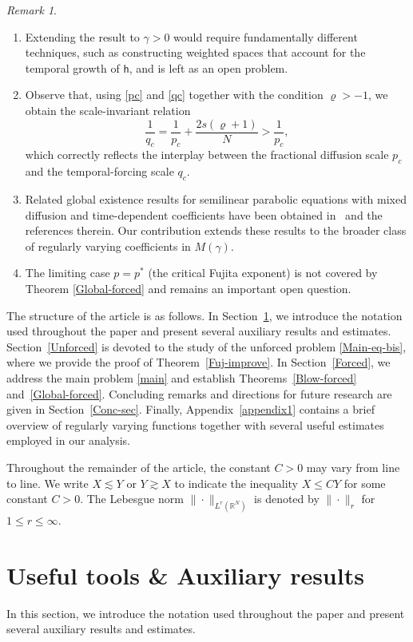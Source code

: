 \documentclass[12pt,reqno]{amsart}
\theoremstyle{plain}
\theoremstyle{definition}
\theoremstyle{remark}
\newtheorem{rem}[thm]{Remark}
\numberwithin{equation}{section}
\newcommand{\h}{\mathsf h}
\begin{document}
\begin{rem}
\begin{enumerate}[label=(\roman*)]
\item Extending the result to $\gamma > 0$ would require fundamentally different 
    techniques, such as constructing weighted spaces that account for the temporal growth of $\h$, 
    and is left as an open problem.
        \item Observe that, using \eqref{pc} and \eqref{qc} together with the 
    condition $\varrho > -1$, we obtain the scale-invariant relation
    $$\frac{1}{q_c} = \frac{1}{p_c} + \frac{2s(\varrho+1)}{N} > \frac{1}{p_c},$$
    which correctly reflects the interplay between the fractional diffusion scale $p_c$ and 
    the temporal-forcing scale $q_c$.
    \item Related global existence results for semilinear parabolic equations with 
    mixed diffusion and time-dependent coefficients have been obtained in~\cite{Beri-arXiv, JKS, MM, Majd} 
    and the references therein. Our contribution extends these results to the broader class 
    of regularly varying coefficients in $M(\gamma)$.
    \item The limiting case $p = p^*$ (the critical Fujita exponent) is not covered 
    by Theorem \ref{Global-forced} and remains an important open question. 
    \end{enumerate}
\end{rem}
The structure of the article is as follows. In Section~\ref{S2}, we introduce the notation used throughout the paper and present several auxiliary results and estimates. Section~\ref{Unforced} is devoted to the study of the unforced problem \eqref{Main-eq-bis}, where we provide the proof of Theorem~\ref{Fuj-improve}. In Section~\ref{Forced}, we address the main problem \eqref{main} and establish Theorems~\ref{Blow-forced} and~\ref{Global-forced}. Concluding remarks and directions for future research are given in Section~\ref{Conc-sec}. Finally, Appendix~\ref{appendix1} contains a brief overview of regularly varying functions together with several useful estimates employed in our analysis.  

Throughout the remainder of the article, the constant $C>0$ may vary from line to line. We write $X \lesssim Y$ or $Y \gtrsim X$ to indicate the inequality $X \leq CY$ for some constant $C>0$. The Lebesgue norm $\|\cdot\|_{L^r(\mathbb{R}^N)}$ is denoted by $\|\cdot\|_{r}$ for $1 \leq r \leq \infty$.


\section{Useful tools \& Auxiliary results}
\label{S2}
In this section, we introduce the notation used throughout the paper and present several auxiliary results and estimates. 
\end{document}
